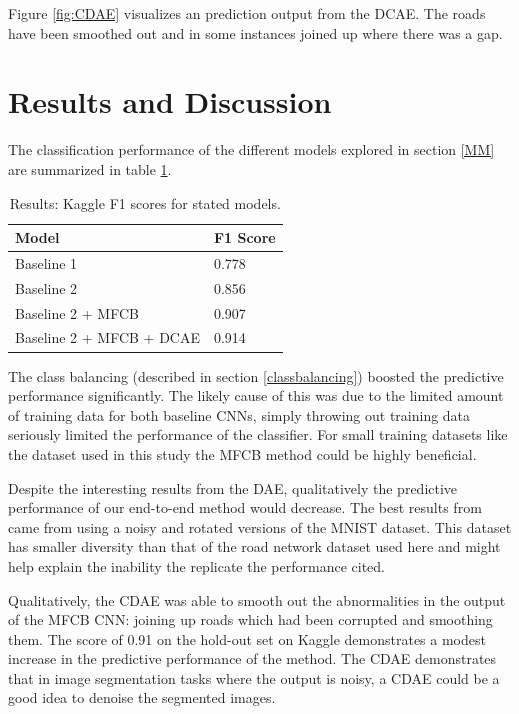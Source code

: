 \documentclass[10pt,conference,compsocconf]{IEEEtran}
\begin{document}
Figure \ref{fig:CDAE} visualizes an prediction output from the DCAE. The roads have been smoothed out and in some instances joined up where there was a gap.

\section{Results and Discussion}
\label{Results}

The classification performance of the different models explored in section \ref{MM} are summarized in table \ref{table:1}. 

\begin{table}[h!]
\centering
\begin{tabular}{|l|l|}
\hline
Model & F1 Score \\ [0.5ex]
\hline
Baseline 1 & 0.778  \\
\hline
Baseline 2 & 0.856  \\
\hline
Baseline 2 + MFCB & 0.907  \\
\hline
Baseline 2 + MFCB + DCAE & 0.914 \\
\hline
\end{tabular}
\caption{Results: Kaggle F1 scores for stated models.}
\label{table:1}
\end{table}

The class balancing (described in section \ref{classbalancing}) boosted the predictive performance significantly. The likely cause of this was due to the limited amount of training data for both baseline CNNs, simply throwing out training data seriously limited the performance of the classifier. For small training datasets like the dataset used in this study the MFCB method could be highly beneficial.

Despite the interesting results from the DAE, qualitatively the predictive performance of our end-to-end method would decrease. The best results from \cite{VincentPASCALVINCENT2010} came from using a noisy and rotated versions of the MNIST dataset. This dataset has smaller diversity than that of the road network dataset used here and might help explain the inability the replicate the performance cited. 

Qualitatively, the CDAE was able to smooth out the abnormalities in the output of the MFCB CNN: joining up roads which had been corrupted and smoothing them. The score of 0.91 on the hold-out set on Kaggle demonstrates a modest increase in the predictive performance of the method. The CDAE demonstrates that in image segmentation tasks where the output is noisy, a CDAE could be a good idea to denoise the segmented images.
\end{document}

